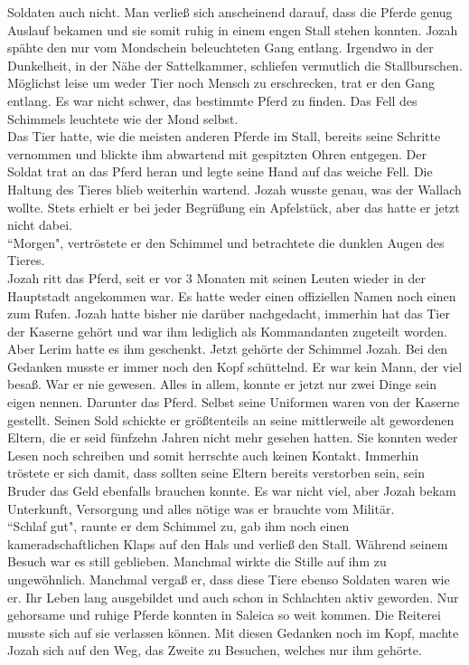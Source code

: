 Soldaten auch nicht. Man verließ sich anscheinend darauf, dass die Pferde genug Auslauf bekamen und 
sie somit ruhig in einem engen Stall stehen konnten. Jozah spähte den nur vom Mondschein 
beleuchteten Gang entlang. Irgendwo in der Dunkelheit, in der Nähe der Sattelkammer, schliefen 
vermutlich die Stallburschen. Möglichst leise um weder Tier noch Mensch zu erschrecken, trat er den 
Gang entlang. Es war nicht schwer, das bestimmte Pferd zu finden. Das Fell des Schimmels leuchtete 
wie der Mond selbst. \\
Das Tier hatte, wie die meisten anderen Pferde im Stall, bereits seine Schritte vernommen und 
blickte ihm abwartend mit gespitzten Ohren entgegen. Der Soldat trat an das Pferd heran und legte 
seine Hand auf das weiche Fell. Die Haltung des Tieres blieb weiterhin wartend. Jozah wusste genau, 
was der Wallach wollte. Stets erhielt er bei jeder Begrüßung ein Apfelstück, aber das hatte er 
jetzt nicht dabei. \\
 ``Morgen", vertröstete er den Schimmel und betrachtete die dunklen Augen des Tieres. \\
Jozah ritt das Pferd, seit er vor 3 Monaten mit seinen Leuten wieder in der Hauptstadt angekommen 
war. Es hatte weder einen offiziellen Namen noch einen zum Rufen. Jozah hatte bisher nie darüber 
nachgedacht, immerhin hat das Tier der Kaserne gehört und war ihm lediglich als Kommandanten 
zugeteilt worden. Aber Lerim hatte es ihm geschenkt. Jetzt gehörte der Schimmel Jozah. Bei den 
Gedanken musste er immer noch den Kopf schüttelnd. Er war kein Mann, der viel besaß. War er nie 
gewesen. Alles in allem, konnte er jetzt nur zwei Dinge sein eigen nennen. Darunter das Pferd. 
Selbst seine Uniformen waren von der Kaserne gestellt. Seinen Sold schickte er größtenteils an 
seine mittlerweile alt gewordenen Eltern, die er seid fünfzehn Jahren nicht mehr gesehen hatten. 
Sie konnten weder Lesen noch schreiben und somit herrschte auch keinen Kontakt. Immerhin tröstete 
er sich damit, dass sollten seine Eltern bereits verstorben sein, sein Bruder das Geld ebenfalls 
brauchen konnte. Es war nicht viel, aber Jozah bekam Unterkunft, Versorgung und alles nötige was er 
brauchte vom Militär. \\
 ``Schlaf gut", raunte er dem Schimmel zu, gab ihm noch einen kameradschaftlichen Klaps auf den 
Hals und verließ den Stall. Während seinem Besuch war es still geblieben. Manchmal wirkte die Stille 
auf ihm zu ungewöhnlich. Manchmal vergaß er, dass diese Tiere ebenso Soldaten waren wie er. Ihr 
Leben lang ausgebildet und auch schon in Schlachten aktiv geworden. Nur gehorsame und ruhige Pferde 
konnten in Saleica so weit kommen. Die Reiterei musste sich auf sie verlassen können. Mit diesen 
Gedanken noch im Kopf, machte Jozah sich auf den Weg, das Zweite zu Besuchen, welches nur ihm 
gehörte. \\

